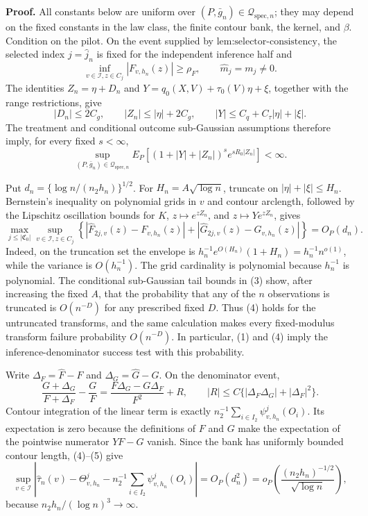 \textbf{Proof.}
All constants below are uniform over \((P,\bar g_n)\in\mathcal Q_{\mathrm{spec},n}\); they may depend on the fixed constants in the law class, the finite contour bank, the kernel, and \(\beta\). Condition on the pilot. On the event supplied by \(\text{lem:selector-consistency}\), the selected index \(j=\widehat j_n\) is fixed for the independent inference half and
\[
 \inf_{v\in\mathcal I,z\in C_j}|F_{v,h_n}(z)|\ge\rho_F,
 \qquad \widehat m_j=m_j\ne0. \tag{1}
\]
The identities \(Z_n=\eta+D_n\) and \(Y=q_0(X,V)+\tau_0(V)\eta+\xi\), together with the range restrictions, give
\[
 |D_n|\le2C_g,
 \qquad |Z_n|\le|\eta|+2C_g,
 \qquad |Y|\le C_q+C_\tau|\eta|+|\xi|. \tag{2}
\]
The treatment and conditional outcome sub-Gaussian assumptions therefore imply, for every fixed \(s<\infty\),
\[
 \sup_{(P,\bar g_n)\in\mathcal Q_{\mathrm{spec},n}}
 E_P\!\left[(1+|Y|+|Z_n|)^s e^{sR_0|Z_n|}\right]<\infty. \tag{3}
\]

Put \(d_n=\{\log n/(n_2h_n)\}^{1/2}\). For \(H_n=A\sqrt{\log n}\), truncate on \(|\eta|+|\xi|\le H_n\). Bernstein's inequality on polynomial grids in \(v\) and contour arclength, followed by the Lipschitz oscillation bounds for \(K\), \(z\mapsto e^{zZ_n}\), and \(z\mapsto Ye^{zZ_n}\), gives
\[
 \max_{j\le|\mathfrak C_0|}\sup_{v\in\mathcal I,z\in C_j}
 \left\{|\widehat F_{2j,v}(z)-F_{v,h_n}(z)|
 +|\widehat G_{2j,v}(z)-G_{v,h_n}(z)|\right\}=O_P(d_n). \tag{4}
\]
Indeed, on the truncation set the envelope is \(h_n^{-1}e^{O(H_n)}(1+H_n)=h_n^{-1}n^{o(1)}\), while the variance is \(O(h_n^{-1})\). The grid cardinality is polynomial because \(h_n^{-1}\) is polynomial. The conditional sub-Gaussian tail bounds in (3) show, after increasing the fixed \(A\), that the probability that any of the \(n\) observations is truncated is \(O(n^{-D})\) for any prescribed fixed \(D\). Thus (4) holds for the untruncated transforms, and the same calculation makes every fixed-modulus transform failure probability \(O(n^{-D})\). In particular, (1) and (4) imply the inference-denominator success test with this probability.

Write \(\Delta_F=\widehat F-F\) and \(\Delta_G=\widehat G-G\). On the denominator event,
\[
 \frac{G+\Delta_G}{F+\Delta_F}-\frac GF
 =\frac{F\Delta_G-G\Delta_F}{F^2}+R,
 \qquad |R|\le C\{|\Delta_F\Delta_G|+|\Delta_F|^2\}. \tag{5}
\]
Contour integration of the linear term is exactly \(n_2^{-1}\sum_{i\in I_2}\psi^j_{v,h_n}(O_i)\). Its expectation is zero because the definitions of \(F\) and \(G\) make the expectation of the pointwise numerator \(YF-G\) vanish. Since the bank has uniformly bounded contour length, (4)--(5) give
\[
 \sup_{v\in\mathcal I}\left|
 \widehat\tau_n(v)-\Theta^j_{v,h_n}
 -n_2^{-1}\sum_{i\in I_2}\psi^j_{v,h_n}(O_i)
 \right|
 =O_P(d_n^2)
 =o_P\!\left(\frac{(n_2h_n)^{-1/2}}{\sqrt{\log n}}\right), \tag{6}
\]
because \(n_2h_n/(\log n)^3\to\infty\).

